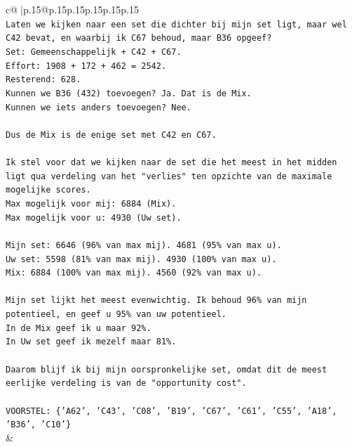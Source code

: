 \documentclass{article}
\begin{document}
{\begin{supertabular}{c@{$\;$}|p{.15\linewidth}@{}p{.15\linewidth}p{.15\linewidth}p{.15\linewidth}p{.15\linewidth}p{.15\linewidth}}
{{{\\ 
\texttt{Laten we kijken naar een set die dichter bij mijn set ligt, maar wel C42 bevat, en waarbij ik C67 behoud, maar B36 opgeef?} \\
\texttt{Set: Gemeenschappelijk + C42 + C67.} \\
\texttt{Effort: 1908 + 172 + 462 = 2542.} \\
\texttt{Resterend: 628.} \\
\texttt{Kunnen we B36 (432) toevoegen? Ja. Dat is de Mix.} \\
\texttt{Kunnen we iets anders toevoegen? Nee.} \\
\\ 
\texttt{Dus de Mix is de enige set met C42 en C67.} \\
\\ 
\texttt{Ik stel voor dat we kijken naar de set die het meest in het midden ligt qua verdeling van het "verlies" ten opzichte van de maximale mogelijke scores.} \\
\texttt{Max mogelijk voor mij: 6884 (Mix).} \\
\texttt{Max mogelijk voor u: 4930 (Uw set).} \\
\\ 
\texttt{Mijn set: 6646 (96\% van max mij). 4681 (95\% van max u).} \\
\texttt{Uw set: 5598 (81\% van max mij). 4930 (100\% van max u).} \\
\texttt{Mix: 6884 (100\% van max mij). 4560 (92\% van max u).} \\
\\ 
\texttt{Mijn set lijkt het meest evenwichtig. Ik behoud 96\% van mijn potentieel, en geef u 95\% van uw potentieel.} \\
\texttt{In de Mix geef ik u maar 92\%.} \\
\texttt{In Uw set geef ik mezelf maar 81\%.} \\
\\ 
\texttt{Daarom blijf ik bij mijn oorspronkelijke set, omdat dit de meest eerlijke verdeling is van de "opportunity cost".} \\
\\ 
\texttt{VOORSTEL: \{'A62', 'C43', 'C08', 'B19', 'C67', 'C61', 'C55', 'A18', 'B36', 'C10'\}} \\
            }
        }
    }
    & \\ \\


\end{supertabular}}
\end{document}
